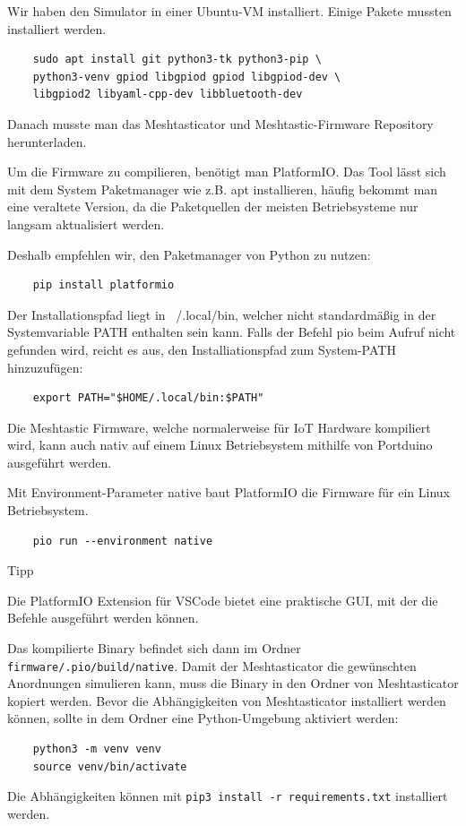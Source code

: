 \documentclass[12pt,a4paper]{article}
\begin{document}
Wir haben den Simulator in einer Ubuntu-VM installiert. Einige Pakete mussten installiert werden.
\begin{lstlisting}
	sudo apt install git python3-tk python3-pip \
	python3-venv gpiod libgpiod gpiod libgpiod-dev \
	libgpiod2 libyaml-cpp-dev libbluetooth-dev
\end{lstlisting}

Danach musste man das Meshtasticator und Meshtastic-Firmware Repository herunterladen.

Um die Firmware zu compilieren, benötigt man PlatformIO. Das Tool lässt sich mit dem System Paketmanager wie z.B. apt installieren, häufig bekommt man eine veraltete Version, da die Paketquellen der meisten Betriebsysteme nur langsam aktualisiert werden.

Deshalb empfehlen wir, den Paketmanager von Python zu nutzen:
\begin{lstlisting}
	pip install platformio
\end{lstlisting}

Der Installationspfad liegt in ~/.local/bin, welcher nicht standardmäßig in der Systemvariable PATH enthalten sein kann. Falls der Befehl pio beim Aufruf nicht gefunden wird, reicht es aus, den Installiationspfad zum System-PATH hinzuzufügen:
\begin{lstlisting}
	export PATH="$HOME/.local/bin:$PATH"
\end{lstlisting}

Die Meshtastic Firmware, welche normalerweise für IoT Hardware kompiliert wird, kann auch nativ auf einem Linux Betriebsystem mithilfe von Portduino ausgeführt werden.

Mit Environment-Parameter native baut PlatformIO die Firmware für ein Linux Betriebsystem.
\begin{lstlisting}
	pio run --environment native
\end{lstlisting}

Tipp

Die PlatformIO Extension für VSCode bietet eine praktische GUI, mit der die Befehle ausgeführt werden können.

Das kompilierte Binary befindet sich dann im Ordner \lstinline{firmware/.pio/build/native}.
Damit der Meshtasticator die gewünschten Anordnungen simulieren kann, muss die Binary in den Ordner von Meshtasticator kopiert werden. Bevor die Abhängigkeiten von Meshtasticator installiert werden können, sollte in dem Ordner eine Python-Umgebung aktiviert werden:
\begin{lstlisting}
	python3 -m venv venv
	source venv/bin/activate
\end{lstlisting}
Die Abhängigkeiten können mit \lstinline{pip3 install -r requirements.txt} installiert werden.
\end{document}
